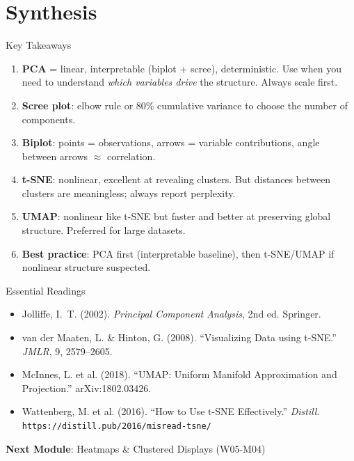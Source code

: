 \documentclass[10pt]{beamer}
\begin{document}
\section{Synthesis}

\begin{frame}{Key Takeaways}
  \begin{enumerate}
    \item \textbf{PCA} = linear, interpretable (biplot + scree),
          deterministic. Use when you need to understand \emph{which
          variables drive} the structure. Always scale first.
    \item \textbf{Scree plot}: elbow rule or 80\% cumulative variance
          to choose the number of components.
    \item \textbf{Biplot}: points = observations, arrows = variable
          contributions, angle between arrows $\approx$ correlation.
    \item \textbf{t-SNE}: nonlinear, excellent at revealing clusters.
          But distances between clusters are meaningless; always
          report perplexity.
    \item \textbf{UMAP}: nonlinear like t-SNE but faster and better at
          preserving global structure. Preferred for large datasets.
    \item \textbf{Best practice}: PCA first (interpretable baseline),
          then t-SNE/UMAP if nonlinear structure suspected.
  \end{enumerate}
\end{frame}

\begin{frame}{Essential Readings}
  \begin{itemize}
    \item Jolliffe, I.~T. (2002). \emph{Principal Component Analysis},
          2nd ed. Springer.
    \item van der Maaten, L. \& Hinton, G. (2008). ``Visualizing Data
          using t-SNE.'' \emph{JMLR}, 9, 2579--2605.
    \item McInnes, L. et al. (2018). ``UMAP: Uniform Manifold
          Approximation and Projection.'' arXiv:1802.03426.
    \item Wattenberg, M. et al. (2016). ``How to Use t-SNE Effectively.''
          \emph{Distill}. \texttt{https://distill.pub/2016/misread-tsne/}
  \end{itemize}
  \vspace{6pt}
  \textbf{Next Module}: Heatmaps \& Clustered Displays (W05-M04)
\end{frame}
\end{document}
